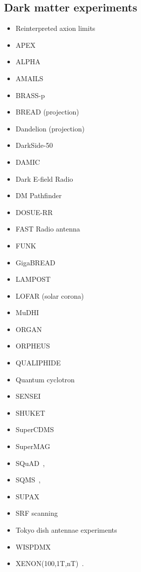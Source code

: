 \documentclass[8pt,twocolumn]{extarticle}
\begin{document}
\begin{mdframed}
\subsection*{Dark matter experiments}\vspace{-0.5em}
\begin{itemize}\setlength\itemsep{-0.5em}
\item Reinterpreted axion limits~\cite{Caputo:2021eaa}
\item APEX~\cite{He:2024ytp}
\item ALPHA~\cite{Millar:2022peq}
\item AMAILS~\cite{Jiang:2023jhl}
  \item BRASS-p~\cite{BRASS-p}
\item BREAD (projection)~\cite{Liu:2021pei}
\item Dandelion (projection)~\cite{Beaufort:2023qpd}
  \item DarkSide-50~\cite{DarkSide:2022knj}
\item DAMIC~\cite{Aguilar-Arevalo:2019wdi}
\item Dark E-field Radio~\cite{Godfrey:2021tvs}
\item DM Pathfinder~\cite{Phipps:2019cqy}
\item DOSUE-RR~\cite{DOSUE-RR:2022ise,Adachi:2023wuo}
 \item FAST Radio antenna~\cite{An:2022hhb}
\item FUNK~\cite{Andrianavalomahefa:2020ucg}
\item GigaBREAD~\cite{Knirck:2023jpu}
\item LAMPOST~\cite{Chiles:2021gxk}
\item LOFAR (solar corona)~\cite{An:2023wij}
\item MuDHI~\cite{Manenti:2021whp}
\item ORGAN~\cite{McAllister:2022ibe}
\item ORPHEUS~\cite{Cervantes:2022yzp}
\item QUALIPHIDE~\cite{Ramanathan:2022egk}
\item Quantum cyclotron~\cite{Fan:2022uwu}
\item SENSEI~\cite{Barak:2020fql}
\item SHUKET~\cite{Brun:2019kak}
\item SuperCDMS~\cite{Aralis:2019nfa}
\item SuperMAG~\cite{Fedderke:2021rrm,Fedderke:2021aqo}
\item SQuAD~\cite{Dixit:2020ymh},
\item SQMS~\cite{Cervantes:2022gtv},
\item SUPAX~\cite{Schneemann:2023bqc}
\item SRF scanning~\cite{Tang:2023oid}
\item Tokyo dish antennae experiments~\cite{Suzuki:2015sza,Knirck:2018ojz,Tomita:2020usq}
\item  WISPDMX~\cite{Nguyen:2019xuh}
\item  XENON(100,1T,nT)~\cite{Bloch:2016sjj,Aprile:2019xxb,Aprile:2020tmw, Bloch:2020uzh,XENON:2021myl,An:2020bxd}. 
\end{itemize}
\end{mdframed}


\onecolumn{


}
\end{document}
